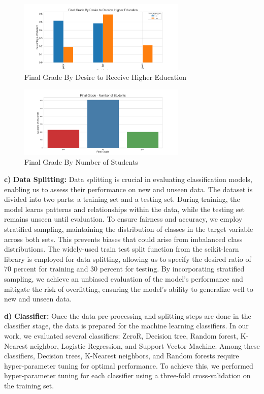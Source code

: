 \documentclass[conference]{IEEEtran}
\begin{document}
\begin{figure}[H]
    \centering
    \includegraphics[width=8cm]{fig4.png}
    \caption{Final Grade By Desire to Receive Higher Education}
    \label{fig:4}
\end{figure}


\begin{figure}[H]
    \centering
    \includegraphics[width=8cm]{fig5.png}
    \caption{Final Grade By Number of Students}
    \label{fig:5}
\end{figure}

\textbf{c)} \textbf{Data Splitting:}
Data splitting is crucial in evaluating classification models, enabling us to assess their performance on new and unseen data. The dataset is divided into two parts: a training set and a testing set. During training, the model learns patterns and relationships within the data, while the testing set remains unseen until evaluation. To ensure fairness and accuracy, we employ stratified sampling, maintaining the distribution of classes in the target variable across both sets. This prevents biases that could arise from imbalanced class distributions. The widely-used train test split function from the scikit-learn library is employed for data splitting, allowing us to specify the desired ratio of 70 percent for training and 30 percent for testing. By incorporating stratified sampling, we achieve an unbiased evaluation of the model's performance and mitigate the risk of overfitting, ensuring the model's ability to generalize well to new and unseen data.\par
\vspace{3mm}
\textbf{d)} \textbf{Classifier:}
Once the data pre-processing and splitting steps are done in the classifier stage, the data is prepared for the machine learning classifiers. In our work, we evaluated several classifiers: ZeroR, Decision tree, Random forest, K-Nearest neighbor, Logistic Regression, and Support Vector Machine. Among these classifiers, Decision trees, K-Nearest neighbors, and Random forests require hyper-parameter tuning for optimal performance. To achieve this, we performed hyper-parameter tuning for each classifier using a three-fold cross-validation on the training set.\par
\end{document}
